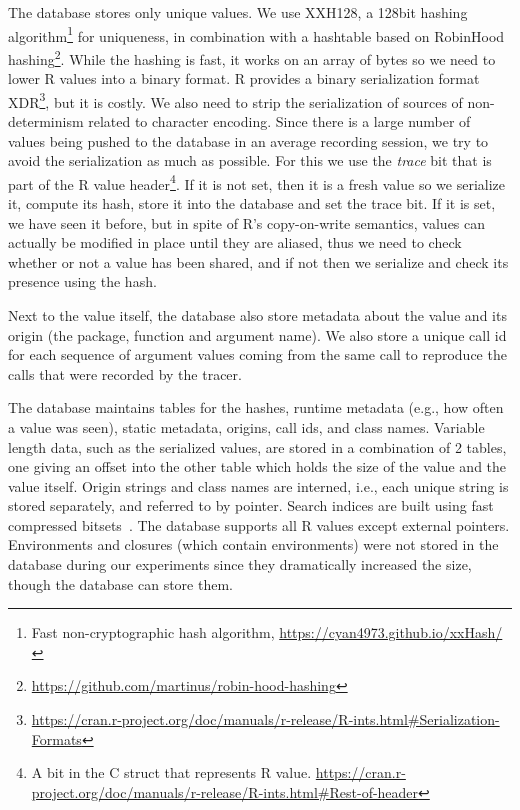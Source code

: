 \documentclass[sigplan,nonacm,anonymous,review]{acmart}
\begin{document}
The database stores only unique values.
We use XXH128, a 128bit hashing algorithm\footnote{Fast non-cryptographic hash algorithm, \Cf \url{https://cyan4973.github.io/xxHash/}} for uniqueness, in combination with a hashtable based on RobinHood hashing\footnote{\url{https://github.com/martinus/robin-hood-hashing}}.
While the hashing is fast, it works on an array of bytes so we need to lower R values into a binary format.
R provides a binary serialization format XDR\footnote{\Cf \url{https://cran.r-project.org/doc/manuals/r-release/R-ints.html\#Serialization-Formats}}, but it is costly. We also need to strip the serialization of sources of non-determinism related to character encoding.
Since there is a large number of values being pushed to the database in an average recording session, we try to avoid the serialization as much as possible.
For this we use the \emph{trace} bit that is part of the R value header\footnote{A bit in the  C struct that represents R value. \Cf \url{https://cran.r-project.org/doc/manuals/r-release/R-ints.html\#Rest-of-header}}.
If it is not set, then it is a fresh value so we serialize it, compute its hash, store it into the database and set the trace bit.
If it is set, we have seen it before, but in spite of R's copy-on-write semantics, values can actually be modified in place until they are aliased, thus we need to check whether or not a value has been shared, and if not then we serialize and check its presence using the hash.


Next to the value itself, the database also store metadata about the value and its origin (the package, function and argument name).
We also store a unique call id for each sequence of argument values coming from the same call to reproduce the calls that were recorded by the tracer.

The database maintains tables for the hashes, runtime metadata (e.g., how often a value was seen), static metadata, origins, call ids, and class names. 
Variable length data, such as the serialized values, are stored in a combination of 2 tables, one giving an offset into the other table which holds the size of the value and the value itself. 
Origin strings and class names are interned, i.e., each unique string is stored separately, and referred to by pointer. 
Search indices are built using fast compressed bitsets~\cite{chambi2016better}.
The database supports all R values except external pointers.
Environments and closures (which contain environments) were not stored in the database during our experiments since they dramatically increased the size, though the database can store them.
\end{document}

